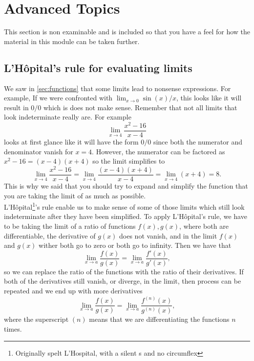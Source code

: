 \chapter{Advanced Topics}
\label{sec:advanced topics}
This section is non examinable and is included so that you have a feel for how the material in this module can be taken further.

\section{L'H\^{o}pital's rule for evaluating limits}
\label{sec:l'hopital}
We saw in \cref{sec:functions} that some limits lead to nonsense expressions. For example, If we were confronted with $\lim_{x\to 0}\sin(x)/x$, this looks like it will result in $0/0$ which is does not make sense. Remember that not all limits that look indeterminate really are. For example
\begin{equation*}
\lim_{x\to 4}\frac{x^{2}-16}{x-4}
\end{equation*}
looks at first glance like it will have the form $0/0$ since both the numerator and denominator vanish for $x=4$. However, the numerator can be factored as $x^{2}-16=(x-4)(x+4)$ so the limit simplifies to
\begin{equation*}
\lim_{x\to 4}\frac{x^{2}-16}{x-4}=\lim_{x\to 4}\frac{(x-4)(x+4)}{x-4}=\lim_{x\to4}(x+4)=8.
\end{equation*}
This is why we said that you should try to expand and simplify the function that you are taking the limit of as much as possible. \\

L'H\^{o}pital\footnote{Originally spelt L'Hospital, with a silent s and no circumflex}'s rule enable us to make sense of some of those limits which still look indeterminate after they have been simplified. To apply L'H\^{o}pital's rule, we have to be taking the limit of a ratio of functions $f(x),g(x)$, where both are differentiable, the derivative of $g(x)$ does not vanish, and in the limit $f(x)$ and $g(x)$ wither both go to zero or both go to infinity. Then we have that
\begin{equation}
\lim_{x\to a}\frac{f(x)}{g(x)}=\lim_{x\to a}\frac{f'(x)}{g'(x)},
\label{eq: l'hopital's rule}
\end{equation}
so we can replace the ratio of the functions with the ratio of their derivatives. If both of the derivatives still vanish, or diverge, in the limit, then process can be repeated and we end up with more derivatives
\begin{equation*}
\lim_{x\to a}\frac{f(x)}{g(x)}=\lim_{x\to a}\frac{f^{(n)}(x)}{g^{(n)}(x)},
\end{equation*}
where the superscript $(n)$ means that we are differentiating the functions $n$ times.\\

